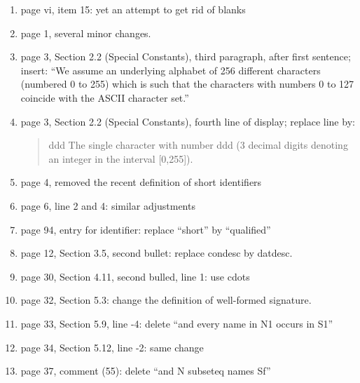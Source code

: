 \begin{description}
\begin{enumerate}
\item page vi, item 15: yet an attempt to get rid of blanks
\item page 1, several minor changes.
\item page 3, Section 2.2 (Special Constants), third paragraph, after first
sentence; insert:
``We assume an underlying alphabet of 256 different characters (numbered 
0 to 255) which is such that the characters with numbers 0 to 127 coincide
with the ASCII character set.''
\item page 3, Section 2.2 (Special Constants), fourth line of display; replace
	line by:
\begin{quote}
	ddd The single character with number ddd (3 decimal digits
             denoting an integer in the interval [0,255]).
\end{quote}
\item page 4, removed the recent definition of short identifiers
\item page 6, line 2 and 4: similar adjustments
\item page 94, entry for identifier: replace ``short'' by ``qualified''
\item page 12, Section 3.5, second bullet: replace condesc by datdesc.
\item page 30, Section 4.11, second bulled, line 1: use cdots
\item page 32, Section 5.3: change the definition of well-formed
      signature.
\item page 33, Section 5.9, line -4: delete ``and every name in N1
      occurs in S1''
\item page 34, Section 5.12, line -2: same change
\item page 37, comment (55): delete ``and  N subseteq names Sf''




\end{enumerate}
\end{description}
